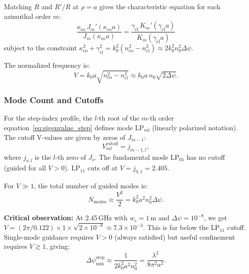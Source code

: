 \documentclass[journal,twocolumn]{IEEEtran}
\begin{document}
Matching $R$ and $R'/R$ at $\rho = a$ gives the characteristic equation
for each azimuthal order $m$:
\begin{equation}
\boxed{
\frac{\kappa_\text{co}\,J_m'(\kappa_\text{co} a)}{J_m(\kappa_\text{co} a)}
= \frac{\gamma_\text{cl}\,K_m'(\gamma_\text{cl} a)}{K_m(\gamma_\text{cl} a)}
}
\label{eq:eigenvalue_step}
\end{equation}
subject to the constraint $\kappa_\text{co}^2 + \gamma_\text{cl}^2
= k_0^2(n_\text{co}^2 - n_\text{cl}^2) \approx 2k_0^2 n_0^2\Delta\psi$.

The normalized frequency is:
\begin{equation}
V = k_0 a\sqrt{n_\text{co}^2 - n_\text{cl}^2}
\approx k_0 a\,n_0\sqrt{2\Delta\psi}.
\label{eq:V_step}
\end{equation}

\subsubsection{Mode Count and Cutoffs}

For the step-index profile, the $l$-th root of the $m$-th order
equation~\eqref{eq:eigenvalue_step} defines mode $\text{LP}_{ml}$
(linearly polarized notation). The cutoff V-values are given by zeros
of $J_{m-1}$:
\begin{equation}
V_{ml}^\text{cutoff} = j_{m-1,l},
\label{eq:step_cutoff}
\end{equation}
where $j_{\nu,l}$ is the $l$-th zero of $J_\nu$. The fundamental
mode $\text{LP}_{01}$ has no cutoff (guided for all $V > 0$).
$\text{LP}_{11}$ cuts off at $V = j_{0,1} = 2.405$.

For $V \gg 1$, the total number of guided modes is:
\begin{equation}
N_\text{modes} \approx \frac{V^2}{2}
= k_0^2 a^2 n_0^2 \Delta\psi.
\label{eq:Nmodes_step}
\end{equation}

\textbf{Critical observation:} At 2.45\,GHz with $w_c = 1$\,m and
$\Delta\psi = 10^{-8}$, we get $V = (2\pi/0.122)\times 1 \times \sqrt{2\times10^{-8}}
\approx 7.3\times10^{-3}$. This is far below the $\text{LP}_{11}$ cutoff.
Single-mode guidance requires $V > 0$ (always satisfied) but useful
confinement requires $V \gtrsim 1$, giving:
\begin{equation}
\Delta\psi_\text{min}^\text{step} \approx \frac{1}{2k_0^2 a^2 n_0^2}
= \frac{\lambda^2}{8\pi^2 a^2}.
\label{eq:psi_min_step}
\end{equation}
\end{document}
